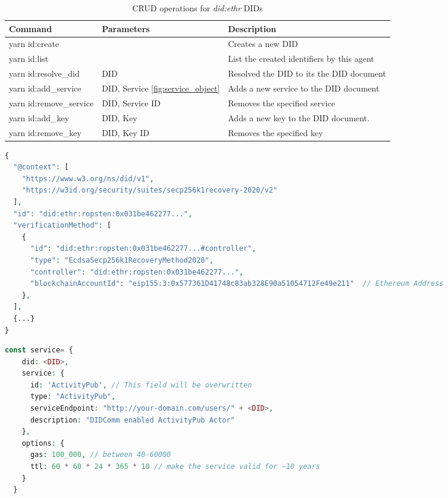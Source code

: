 \begin{table}[H]
  \centering
  \begin{tabular}{|p{4cm}|p{3cm}|p{7cm}| }
    \hline
    Command & Parameters & Description \\
    \hline
    \hline
    yarn id:create & & Creates a new DID \\
    \hline
    yarn id:list & & List the created identifiers by this agent \\
    \hline
    yarn id:resolve\_did & DID & Resolved the DID to its the DID document \\
    \hline
    yarn id:add\_service & DID,  Service \ref{fig:service_object} & Adds a new service to the DID document \\
    \hline
    yarn id:remove\_service & DID, Service ID & Removes the specified service\\
    \hline
    yarn id:add\_key & DID, Key & Adds a new key to the DID document. \\
    \hline
    yarn id:remove\_key & DID, Key ID & Removes the specified key\\
    \hline
  \end{tabular}
  \caption{CRUD operations for \emph{did:ethr} DIDs}
  \label{table:yarn_scripts}
\end{table}

\lstset{style=JSONStyle}
\begin{lstlisting}[language=PHP, caption=Controller address inside the DID document, label=fig:blockchain_id, float=h]
  {
  "@context": [
    "https://www.w3.org/ns/did/v1",
    "https://w3id.org/security/suites/secp256k1recovery-2020/v2"
  ],
  "id": "did:ethr:ropsten:0x031be462277...",
  "verificationMethod": [
    {
      "id": "did:ethr:ropsten:0x031be462277...#controller",
      "type": "EcdsaSecp256k1RecoveryMethod2020",
      "controller": "did:ethr:ropsten:0x031be462277...",
      "blockchainAccountId": "eip155:3:0x577361D41748c83ab328E90a51054712Fe49e211"  // Ethereum Address
    },
  ],
  {...}
}
\end{lstlisting}

\lstset{style=JSONStyle}
\begin{lstlisting}[language=PHP, caption=Parameters to add a service in Veramo, label=fig:service_object, float=h]
  const service= {
    did: <DID>,
    service: {
      id: 'ActivityPub', // This field will be overwritten
      type: "ActivityPub",
      serviceEndpoint: "http://your-domain.com/users/" + <DID>,
      description: "DIDComm enabled ActivityPub Actor"
    },
    options: {
      gas: 100_000, // between 40-60000
      ttl: 60 * 60 * 24 * 365 * 10 // make the service valid for ~10 years
    }
  }
\end{lstlisting}





